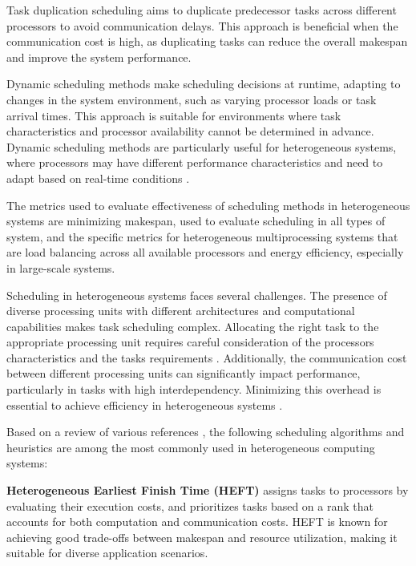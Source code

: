 Task duplication scheduling aims to duplicate predecessor tasks across different processors to avoid communication delays. This approach is beneficial when the communication cost is high, as duplicating tasks can reduce the overall makespan and improve the system performance.

Dynamic scheduling methods make scheduling decisions at runtime, adapting to changes in the system environment, such as varying processor loads or task arrival times. This approach is suitable for environments where task characteristics and processor availability cannot be determined in advance. Dynamic scheduling methods are particularly useful for heterogeneous systems, where processors may have different performance characteristics and need to adapt based on real-time conditions \cite{Xie2019}. 

The metrics used to evaluate effectiveness of scheduling methods in heterogeneous systems are minimizing makespan, used to evaluate scheduling in all types of system, and the specific metrics for heterogeneous multiprocessing systems that are load balancing across all available processors and energy efficiency, especially in large-scale systems.

Scheduling in heterogeneous systems faces several challenges. The presence of diverse processing units with different architectures and computational capabilities makes task scheduling complex. Allocating the right task to the appropriate processing unit requires careful consideration of the processors characteristics and the tasks requirements \cite{AlEbrahim2017}. Additionally, the communication cost between different processing units can significantly impact performance, particularly in tasks with high interdependency. Minimizing this overhead is essential to achieve efficiency in heterogeneous systems \cite{Amalarethinam2015}.

Based on a review of various references \cite{Amalarethinam2015,Xie2019, Alam2018, AlEbrahim2017, chen2017, singh2016}, the following scheduling algorithms and heuristics are among the most commonly used in heterogeneous computing systems:

\textbf{Heterogeneous Earliest Finish Time (HEFT)}  assigns tasks to processors by evaluating their execution costs, and prioritizes tasks based on a rank that accounts for both computation and communication costs. HEFT is known for achieving good trade-offs between makespan and resource utilization, making it suitable for diverse application scenarios.

